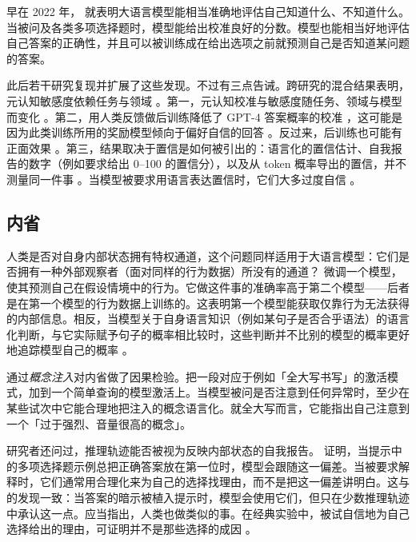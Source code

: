 早在 2022 年，\citet{kadavath2022language} 就表明大语言模型能相当准确地评估自己知道什么、不知道什么。当被问及各类多项选择题时，模型能给出校准良好的分数。模型也能相当好地评估自己答案的正确性，并且可以被训练成在给出选项之前就预测自己是否知道某问题的答案。

此后若干研究复现并扩展了这些发现。不过有三点告诫。跨研究的混合结果表明，元认知敏感度依赖任务与领域 \citep{liu2026metacog}。第一，元认知校准与敏感度随任务、领域与模型而变化 \citep{liu2026metacog}。第二，用人类反馈做后训练降低了 GPT-4 答案概率的校准 \citep{openai2024gpt4}，这可能是因为此类训练所用的奖励模型倾向于偏好自信的回答 \citep{leng2025taming}。反过来，后训练也可能有正面效果 \citep{lindsey2025introspection}。第三，结果取决于置信是如何被引出的：语言化的置信估计、自我报告的数字（例如要求给出 0–100 的置信分），以及从 token 概率导出的置信，并不测量同一件事 \citep{liu2026metacog}。当模型被要求用语言表达置信时，它们大多过度自信 \citep{xiong2024can}。

\subsection{内省}
人类是否对自身内部状态拥有特权通道，这个问题同样适用于大语言模型：它们是否拥有一种外部观察者（面对同样的行为数据）所没有的通道？\citet{binder2024looking} 微调一个模型，使其预测自己在假设情境中的行为。它做这件事的准确率高于第二个模型——后者是在第一个模型的行为数据上训练的。这表明第一个模型能获取仅靠行为无法获得的内部信息。相反，当模型关于自身语言知识（例如某句子是否合乎语法）的语言化判断，与它实际赋予句子的概率相比较时，这些判断并不比别的模型的概率更好地追踪模型自己的概率 \citep{song2025languagemodelsfailintrospect}。

\citet{lindsey2025introspection} 通过\emph{概念注入}对内省做了因果检验。把一段对应于例如「全大写书写」的激活模式，加到一个简单查询的模型激活上。当模型被问是否注意到任何异常时，至少在某些试次中它能合理地把注入的概念语言化。就全大写而言，它能指出自己注意到一个「过于强烈、音量很高的概念」。

研究者还问过，推理轨迹能否被视为反映内部状态的自我报告。\citet{turpin2023language} 证明，当提示中的多项选择题示例总把正确答案放在第一位时，模型会跟随这一偏差。当被要求解释时，它们通常用合理化来为自己的选择找理由，而不是把这一偏差讲明白。这与 \citet{chen2025reasoningmodelsdontsay} 的发现一致：当答案的暗示被植入提示时，模型会使用它们，但只在少数推理轨迹中承认这一点。应当指出，人类也做类似的事。在经典实验中，被试自信地为自己选择给出的理由，可证明并不是那些选择的成因 \citep{nisbett1977telling}。

